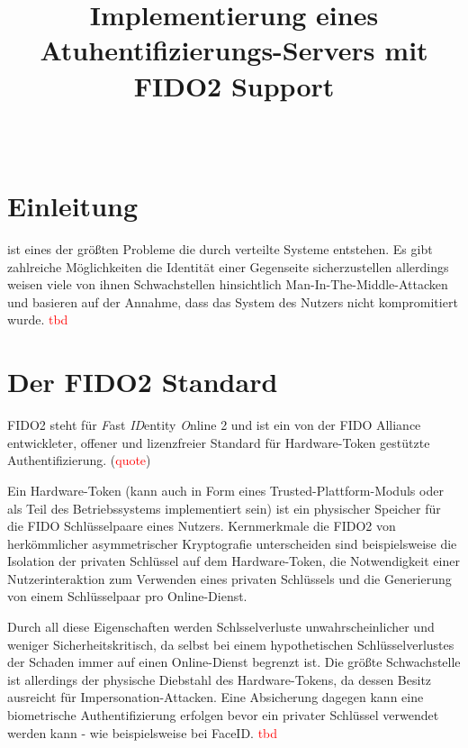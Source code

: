 \documentclass[journal]{IEEEtran}
\title{Implementierung eines Atuhentifizierungs-Servers mit FIDO2 Support}
\author{
	\IEEEauthorblockN{Mara Schulke \textit{(Matrikel-Nr. 20215853)}}\\
	\IEEEauthorblockA{
		Technische Hochschule Brandenburg \\
		B.Sc. IT Sicherheit \\
		Hardware Sicherheit
	}
}
\begin{document}

\maketitle

\begin{abstract}
\end{abstract}

\section{Einleitung}
 ist eines der größten
Probleme die durch verteilte Systeme entstehen. Es gibt zahlreiche
Möglichkeiten die Identität einer Gegenseite sicherzustellen allerdings weisen
viele von ihnen Schwachstellen hinsichtlich Man-In-The-Middle-Attacken und
basieren auf der Annahme, dass das System des Nutzers nicht kompromitiert
wurde. \textcolor{red}{tbd}

\section{Der FIDO2 Standard}

FIDO2 steht für \textit{F}ast \textit{ID}entity \textit{O}nline 2 und ist ein von
der FIDO Alliance entwickleter, offener und lizenzfreier Standard für
Hardware-Token gestützte Authentifizierung. (\textcolor{red}{quote})

Ein Hardware-Token (kann auch in Form eines Trusted-Plattform-Moduls oder als
Teil des Betriebssystems implementiert sein) ist ein physischer Speicher für
die FIDO Schlüsselpaare eines Nutzers. Kernmerkmale die FIDO2 von
herkömmlicher asymmetrischer Kryptografie unterscheiden sind beispielsweise die
Isolation der privaten Schlüssel auf dem Hardware-Token, die Notwendigkeit
einer Nutzerinteraktion zum Verwenden eines privaten Schlüssels und die
Generierung von einem Schlüsselpaar pro Online-Dienst.

Durch all diese Eigenschaften werden Schlsselverluste unwahrscheinlicher und
weniger Sicherheitskritisch, da selbst bei einem hypothetischen
Schlüsselverlustes der Schaden immer auf einen Online-Dienst begrenzt ist.
Die größte Schwachstelle ist allerdings der physische Diebstahl des
Hardware-Tokens, da dessen Besitz ausreicht für Impersonation-Attacken. Eine
Absicherung dagegen kann eine biometrische Authentifizierung erfolgen bevor ein
privater Schlüssel verwendet werden kann - wie beispielsweise bei FaceID.
\textcolor{red}{tbd}
\end{document}
